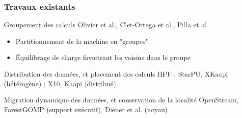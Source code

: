 \documentclass[xcolor={usenames,dvipsnames,svgnames,table}, aspectratio=43]{beamer}
\renewcommand{\emph}[1]{{\usebeamercolor[fg]{titlelike}#1}}
\begin{document}
\begin{frame}
  \frametitle{Travaux existants}
  \begin{block}{Groupement des calculs}
    Olivier et al., Clet-Ortega et al., Pilla et al.
    \begin{itemize}
      \item Partitionnement de la machine en "groupes"
      \item Équilibrage de charge favorisant les voisins dans le groupe
    \end{itemize}
  \end{block}

  \begin{block}{Distribution des données, et placement des calculs}
    HPF ;  StarPU, XKaapi (hétérogène) ; X10, Kaapi (distribué)
  \end{block}

  \begin{block}{Migration dynamique des données, et conservation de la localité}
    OpenStream, ForestGOMP (support exécutif), Diener et al. (noyau)
  \end{block}

\end{frame}
\end{document}
